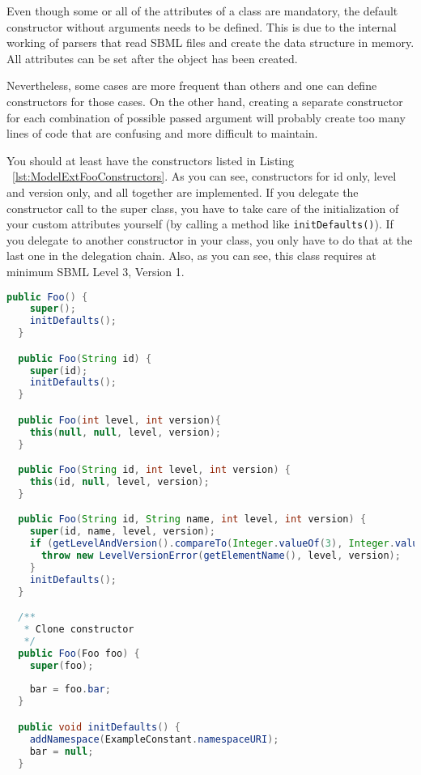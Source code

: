 Even though some or all of the attributes of a class are mandatory, the default constructor without arguments needs to be defined.
This is due to the internal working of parsers that read SBML files and create the data structure in memory.
All attributes can be set after the object has been created.

Nevertheless, some cases are more frequent than others and one can define constructors for those cases.
On the other hand, creating a separate constructor for each combination of possible passed argument will probably create too many lines of code
that are confusing and more difficult to maintain.

You should at least have the constructors listed in Listing ~\vref{lst:ModelExtFooConstructors}.
As you can see, constructors for id only, level and version only, and all together are implemented.
If you delegate the constructor call to the super class, you have to take care of the initialization of your custom attributes yourself (by calling a method like \texttt{initDefaults()}).
If you delegate to another constructor in your class, you only have to do that at the last one in the delegation chain.
Also, as you can see, this class requires at minimum SBML Level 3, Version 1.

\begin{lstlisting}[language=Java,caption={Constructors for \texttt{Foo}},label={lst:ModelExtFooConstructors}]
  public Foo() {
    super();
    initDefaults();
  }

  public Foo(String id) {
    super(id);
    initDefaults();
  }

  public Foo(int level, int version){
    this(null, null, level, version);
  }

  public Foo(String id, int level, int version) {
    this(id, null, level, version);
  }

  public Foo(String id, String name, int level, int version) {
    super(id, name, level, version);
    if (getLevelAndVersion().compareTo(Integer.valueOf(3), Integer.valueOf(1)) < 0) {
      throw new LevelVersionError(getElementName(), level, version);
    }
    initDefaults();
  }

  /**
   * Clone constructor
   */
  public Foo(Foo foo) {
    super(foo);
    
    bar = foo.bar;
  }

  public void initDefaults() {
    addNamespace(ExampleConstant.namespaceURI);
    bar = null;
  }
\end{lstlisting}

